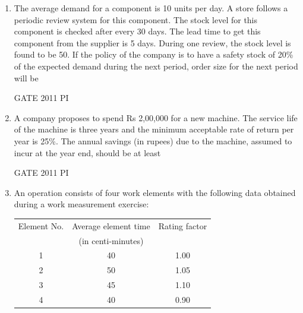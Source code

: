 \documentclass[journal,12pt,onecolumn]{IEEEtran}
\theoremstyle{remark}
\begin{document}
\begin{enumerate}
\item The average demand for a component is 10 units per day. A store follows a periodic review system for this component. The stock level for this component is checked after every 30 days. The lead time to get this component from the supplier is 5 days. During one review, the stock level is found to be 50. If the policy of the company is to have a safety stock of 20\% of the expected demand during the next period, order size for the next period will be

\hfill{GATE 2011 PI}
\begin{enumerate}
\end{enumerate}

\item A company proposes to spend Rs 2,00,000 for a new machine. The service life of the machine is three years and the minimum acceptable rate of return per year is 25\%. The annual savings (in rupees) due to the machine, assumed to incur at the year end, should be at least

\hfill{GATE 2011 PI}
\begin{enumerate}
\end{enumerate}

\item An operation consists of four work elements with the following data obtained during a work measurement exercise:

\begin{tabular}{|c|c|c|}
    \hline
    Element No. & Average element time & Rating factor \\
                & (in centi-minutes)  &              \\
    \hline
    1 & 40 & 1.00 \\
    2 & 50 & 1.05 \\
    3 & 45 & 1.10 \\
    4 & 40 & 0.90 \\
    \hline
\end{tabular}


\end{enumerate}
\end{document}

